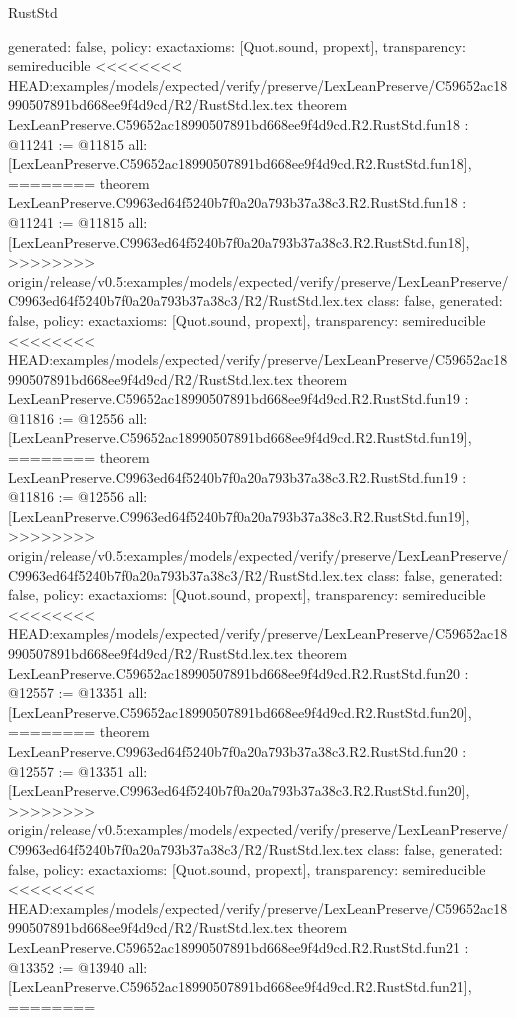 \begin{lexlean}{RustStd}
\begin{coremodule}
{\begin{coremodule}
{{{{{{{{{{{{{{{{{{{{{  generated: false,
  policy: exact{axioms: [Quot.sound, propext]},
  transparency: semireducible
}
<<<<<<<< HEAD:examples/models/expected/verify/preserve/LexLeanPreserve/C59652ac18990507891bd668ee9f4d9cd/R2/RustStd.lex.tex
theorem LexLeanPreserve.C59652ac18990507891bd668ee9f4d9cd.R2.RustStd.fun18 : @11241 := @11815 {
  all: [LexLeanPreserve.C59652ac18990507891bd668ee9f4d9cd.R2.RustStd.fun18],
========
theorem LexLeanPreserve.C9963ed64f5240b7f0a20a793b37a38c3.R2.RustStd.fun18 : @11241 := @11815 {
  all: [LexLeanPreserve.C9963ed64f5240b7f0a20a793b37a38c3.R2.RustStd.fun18],
>>>>>>>> origin/release/v0.5:examples/models/expected/verify/preserve/LexLeanPreserve/C9963ed64f5240b7f0a20a793b37a38c3/R2/RustStd.lex.tex
  class: false,
  generated: false,
  policy: exact{axioms: [Quot.sound, propext]},
  transparency: semireducible
}
<<<<<<<< HEAD:examples/models/expected/verify/preserve/LexLeanPreserve/C59652ac18990507891bd668ee9f4d9cd/R2/RustStd.lex.tex
theorem LexLeanPreserve.C59652ac18990507891bd668ee9f4d9cd.R2.RustStd.fun19 : @11816 := @12556 {
  all: [LexLeanPreserve.C59652ac18990507891bd668ee9f4d9cd.R2.RustStd.fun19],
========
theorem LexLeanPreserve.C9963ed64f5240b7f0a20a793b37a38c3.R2.RustStd.fun19 : @11816 := @12556 {
  all: [LexLeanPreserve.C9963ed64f5240b7f0a20a793b37a38c3.R2.RustStd.fun19],
>>>>>>>> origin/release/v0.5:examples/models/expected/verify/preserve/LexLeanPreserve/C9963ed64f5240b7f0a20a793b37a38c3/R2/RustStd.lex.tex
  class: false,
  generated: false,
  policy: exact{axioms: [Quot.sound, propext]},
  transparency: semireducible
}
<<<<<<<< HEAD:examples/models/expected/verify/preserve/LexLeanPreserve/C59652ac18990507891bd668ee9f4d9cd/R2/RustStd.lex.tex
theorem LexLeanPreserve.C59652ac18990507891bd668ee9f4d9cd.R2.RustStd.fun20 : @12557 := @13351 {
  all: [LexLeanPreserve.C59652ac18990507891bd668ee9f4d9cd.R2.RustStd.fun20],
========
theorem LexLeanPreserve.C9963ed64f5240b7f0a20a793b37a38c3.R2.RustStd.fun20 : @12557 := @13351 {
  all: [LexLeanPreserve.C9963ed64f5240b7f0a20a793b37a38c3.R2.RustStd.fun20],
>>>>>>>> origin/release/v0.5:examples/models/expected/verify/preserve/LexLeanPreserve/C9963ed64f5240b7f0a20a793b37a38c3/R2/RustStd.lex.tex
  class: false,
  generated: false,
  policy: exact{axioms: [Quot.sound, propext]},
  transparency: semireducible
}
<<<<<<<< HEAD:examples/models/expected/verify/preserve/LexLeanPreserve/C59652ac18990507891bd668ee9f4d9cd/R2/RustStd.lex.tex
theorem LexLeanPreserve.C59652ac18990507891bd668ee9f4d9cd.R2.RustStd.fun21 : @13352 := @13940 {
  all: [LexLeanPreserve.C59652ac18990507891bd668ee9f4d9cd.R2.RustStd.fun21],
========
}}}}}}}}}}}}}}}}}}}}}}}}
\end{coremodule}}
\end{coremodule}
\end{lexlean}
